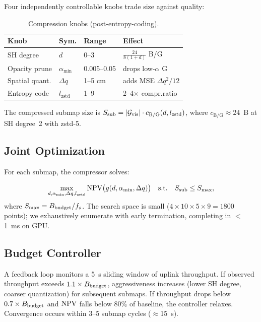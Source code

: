 Four independently controllable knobs trade size against quality:

\begin{table}[t]
  \centering
  \caption{Compression knobs (post-entropy-coding).}
  \label{tab:knobs}
  \footnotesize
  \setlength{\tabcolsep}{3pt}
  \begin{tabular}{@{}p{1.8cm}p{0.9cm}p{1.1cm}p{3.6cm}@{}}
    \toprule
    Knob & Sym. & Range & Effect \\
    \midrule
    SH degree      & $d$   & 0--3   & $\frac{24}{8(1+d)}$ B/G \\
    Opacity prune  & $\alpha_{\min}$ & 0.005--0.05 & drops low-$\alpha$ G \\
    Spatial quant.\@& $\Delta q$ & 1--5 cm & adds MSE $\Delta q^2/12$ \\
    Entropy code   & $l_{\text{zstd}}$ & 1--9 & 2--4$\times$ compr.\@ ratio \\
    \bottomrule
  \end{tabular}
\end{table}

The compressed submap size is $S_{\text{sub}}=|\mathcal{G}_{\text{vis}}|\cdot
c_{\text{B/G}}(d,l_{\text{zstd}})$, where $c_{\text{B/G}}\approx 24$~B at
SH degree~2 with zstd-5.

\subsection{Joint Optimization}

For each submap, the compressor solves:

\begin{equation}
  \max_{d,\alpha_{\min},\Delta q,l_{\text{zstd}}} \text{NPV}\bigl(g(d,\alpha_{\min},\Delta q)\bigr)
  \quad\text{s.t.}\quad S_{\text{sub}}\le S_{\max},
  \label{eq:opt}
\end{equation}
where $S_{\max}=B_{\text{budget}}/f_s$. The search space is small ($4\times10\times5\times9
=1800$ points); we exhaustively enumerate with early termination, completing
in $<$1~ms on GPU.

\subsection{Budget Controller}

A feedback loop monitors a 5~s sliding window of uplink throughput. If
observed throughput exceeds $1.1\times B_{\text{budget}}$, aggressiveness increases
(lower SH degree, coarser quantization) for subsequent submaps. If
throughput drops below $0.7\times B_{\text{budget}}$ and $\text{NPV}$ falls below 80\%
of baseline, the controller relaxes. Convergence occurs within 3--5 submap
cycles ($\approx$15~s).
